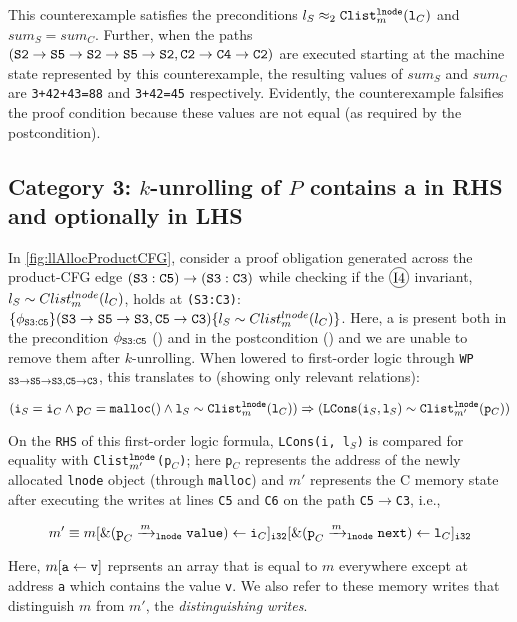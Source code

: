 This counterexample satisfies the preconditions $l_S\approx_2{\tt Clist}^{{\tt lnode}}_{m}({\tt l}_C)$
and $sum_S=sum_C$. Further, when the
paths $({\tt S2\rightarrow S5\rightarrow S2\rightarrow S5\rightarrow S2}, {\tt C2\rightarrow C4\rightarrow C2})$
are executed starting at the machine state represented by this counterexample, the resulting
values of $sum_S$ and $sum_C$ are {\tt 3+42+43=88} and {\tt 3+42=45} respectively. Evidently, the
counterexample falsifies the proof condition because these values are not equal (as required by the postcondition).
\vspace{-6px}
\subsection[Handling Category 3 Proof Obligations]{Category 3: $k$-unrolling of $P$ contains a \recursiveRelation{} in RHS and optionally in LHS}
\label{sec:cat3}
In \cref{fig:llAllocProductCFG}, consider a proof obligation generated
across the product-CFG edge ${\tt (S3:C5) \rightarrow (S3:C3)}$
while checking if the {\small $\circled{I4}$} invariant, $l_{S}\sim{}Clist^{lnode}_{m}(l_{C})$,
holds at {\tt (S3:C3)}:
$\{\phi_{{\tt S3:C5}}\} ({\tt S3\rightarrow S5\rightarrow S3}, {\tt C5\rightarrow C3}) \{l_{S}\sim{}Clist^{lnode}_{m}(l_{C})\}$.
Here, a \recursiveRelation{} is present both in the precondition $\phi_{{\tt S3:C5}}$ ({\small {}})
and in the postcondition ({\small {}}) and we are unable to
remove them after $k$-unrolling.
When lowered to first-order logic
through {\tt WP$_{{\tt S3\rightarrow S5\rightarrow S3},{\tt C5\rightarrow C3}}$}, this translates to (showing only relevant
relations):
\vspace{-5px}
\begin{small}
\begin{equation}\label{eqn:ex1cat3}
({\tt i}_S={\tt i}_C \land {\tt p}_C={\tt malloc()} \land {\tt l}_S \sim{} {\tt Clist}_m^{{\tt lnode}}({\tt l}_C)) \Rightarrow ({\tt LCons}({\tt i}_S, {\tt l}_S) \sim{} {\tt Clist}_{m'}^{{\tt lnode}}({\tt p}_C))
\end{equation}
\end{small}
On the {\tt RHS} of this first-order logic formula, {\tt LCons(i, l$_S$)} is compared for
equality with {\tt Clist$_{m'}^{{\tt lnode}}$(p$_C$)}; here {\tt p$_C$}
represents the address of the newly allocated {\tt lnode} object (through {\tt malloc}) and $m'$
represents the C memory state after executing the writes at lines
{\tt C5} and {\tt C6} on the path {\tt C5$\rightarrow$C3},
i.e.,
\vspace{-5px}
\begin{small}
\begin{equation}\label{eqn:memstore}
m' \equiv m[{\tt \&(p}_C\xrightarrow[]{m}_{\mathrm{\tt lnode}}{\tt value}) \leftarrow {\tt i}_C]_{\tt i32}[{\tt \&(p}_C\xrightarrow[]{m}_{\mathrm{\tt lnode}}{\tt next}) \leftarrow {\tt l}_C]_{\tt i32}
\end{equation}
\end{small}
Here, $m[{\tt a}\leftarrow{\tt v}]$ reprsents an array that is
equal to $m$ everywhere except at address {\tt a} which contains the value {\tt v}.
We also refer to
these memory writes that distinguish $m$ from $m'$, the {\em distinguishing writes}.

